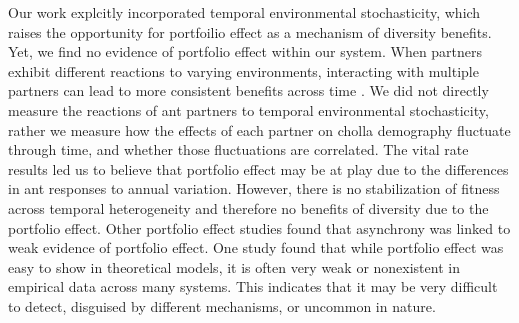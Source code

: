 \documentclass[11pt]{article}
\begin{document}

Our work explcitly incorporated temporal environmental stochasticity, which raises the opportunity for portfoilio effect as a mechanism of diversity benefits. 
Yet, we find no evidence of portfolio effect within our system. 
When partners exhibit different reactions to varying environments, interacting with multiple partners can lead to more consistent benefits across time \citep{Batstone2018}.
We did not directly measure the reactions of ant partners to temporal environmental stochasticity, rather we measure how the effects of each partner on cholla demography fluctuate through time, and whether those fluctuations are correlated.
The vital rate results led us to believe that portfolio effect may be at play due to the differences in ant responses to annual variation.
However, there is no stabilization of fitness across temporal heterogeneity and therefore no benefits of diversity due to the portfolio effect.
Other portfolio effect studies \citep{Lazaro2022,Tornos2023} found that asynchrony was linked to weak evidence of portfolio effect.
One study \cite{dallas2022temporal} found that while portfolio effect was easy to show in theoretical models, it is often very weak or nonexistent in empirical data across many systems. 
This indicates that it may be very difficult to detect, disguised by different mechanisms, or uncommon in nature.
\end{document}
